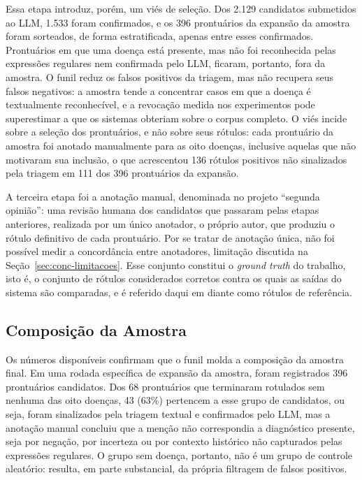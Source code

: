Essa etapa introduz, porém, um viés de seleção. Dos 2.129 candidatos submetidos ao LLM, 1.533 foram confirmados, e os 396 prontuários da expansão da amostra foram sorteados, de forma estratificada, apenas entre esses confirmados. Prontuários em que uma doença está presente, mas não foi reconhecida pelas expressões regulares nem confirmada pelo LLM, ficaram, portanto, fora da amostra. O funil reduz os falsos positivos da triagem, mas não recupera seus falsos negativos: a amostra tende a concentrar casos em que a doença é textualmente reconhecível, e a revocação medida nos experimentos pode superestimar a que os sistemas obteriam sobre o corpus completo. O viés incide sobre a seleção dos prontuários, e não sobre seus rótulos: cada prontuário da amostra foi anotado manualmente para as oito doenças, inclusive aquelas que não motivaram sua inclusão, o que acrescentou 136 rótulos positivos não sinalizados pela triagem em 111 dos 396 prontuários da expansão.

A terceira etapa foi a anotação manual, denominada no projeto ``segunda opinião'': uma revisão humana dos candidatos que passaram pelas etapas anteriores, realizada por um único anotador, o próprio autor, que produziu o rótulo definitivo de cada prontuário. Por se tratar de anotação única, não foi possível medir a concordância entre anotadores, limitação discutida na Seção~\ref{sec:conc-limitacoes}. Esse conjunto constitui o \textit{ground truth} do trabalho, isto é, o conjunto de rótulos considerados corretos contra os quais as saídas do sistema são comparadas, e é referido daqui em diante como rótulos de referência.

\subsection{Composição da Amostra}\label{sec:met-composicao}

Os números disponíveis confirmam que o funil molda a composição da amostra final. Em uma rodada específica de expansão da amostra, foram registrados 396 prontuários candidatos. Dos 68 prontuários que terminaram rotulados sem nenhuma das oito doenças, 43 (63\%) pertencem a esse grupo de candidatos, ou seja, foram sinalizados pela triagem textual e confirmados pelo LLM, mas a anotação manual concluiu que a menção não correspondia a diagnóstico presente, seja por negação, por incerteza ou por contexto histórico não capturados pelas expressões regulares. O grupo sem doença, portanto, não é um grupo de controle aleatório: resulta, em parte substancial, da própria filtragem de falsos positivos.

